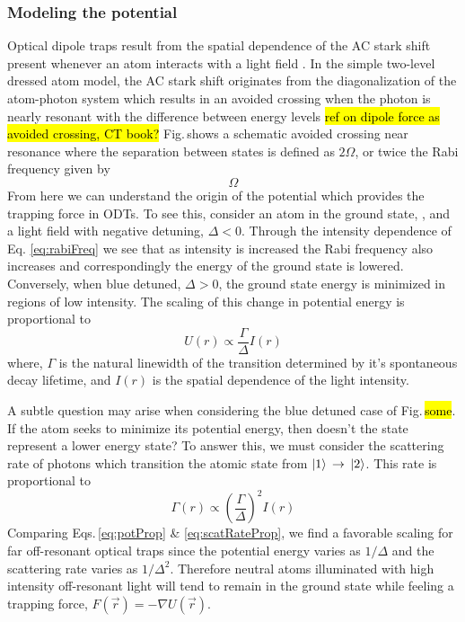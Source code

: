 \subsubsection{Modeling the potential} \label{sssec:1064_modeling}
Optical dipole traps result from the spatial dependence of the AC stark shift present whenever an atom interacts with a light field \cite{Grimm1999a}.
In the simple two-level dressed atom model, the AC stark shift originates from the diagonalization of the atom-photon system which results in an avoided crossing when the photon is nearly resonant with the difference between energy levels \hl{ref on dipole force as avoided crossing, CT book?}
Fig.\,shows a schematic avoided crossing near resonance where the separation between states is defined as $2\Omega$, or twice the Rabi frequency given by
\begin{equation}
	\Omega
	\label{eq:rabiFreq}
\end{equation}
From here we can understand the origin of the potential which provides the trapping force in ODTs.
To see this, consider an atom in the ground state, , and a light field with negative detuning, $\Delta < 0$.
Through the intensity dependence of Eq. \ref{eq:rabiFreq} we see that as intensity is increased the Rabi frequency also increases and correspondingly the energy of the ground state is lowered.
Conversely, when blue detuned, $\Delta>0$, the ground state energy is minimized in regions of low intensity.
The scaling of this change in potential energy is proportional to
\begin{equation} \label{eq:potProp}
	U(r) \varpropto \frac{\Gamma}{\Delta}I(r)
\end{equation}
where, $\Gamma$ is the natural linewidth of the transition determined by it's spontaneous decay lifetime, and $I(r)$ is the spatial dependence of the light intensity.

A subtle question may arise when considering the blue detuned case of Fig.\,\hl{some}.
If the atom seeks to minimize its potential energy, then doesn't the state  represent a lower energy state?
To answer this, we must consider the scattering rate of photons which transition the atomic state from $\left| {1} \right>\,\rightarrow\,\left| {2} \right>$.
This rate is proportional to
\begin{equation} \label{eq:scatRateProp}
	\Gamma(r) \varpropto \left(\frac{\Gamma}{\Delta}\right)^2 I(r)
\end{equation}
Comparing Eqs.\,\ref{eq:potProp} \& \ref{eq:scatRateProp}, we find a favorable scaling for far off-resonant optical traps since the potential energy varies as $1/\Delta$ and the scattering rate varies as $1/\Delta^2$.
Therefore neutral atoms illuminated with high intensity off-resonant light will tend to remain in the ground state while feeling a trapping force, $F(\vec{r}) = -\nabla U(\vec{r})$.


